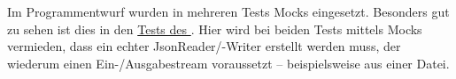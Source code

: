 Im Programmentwurf wurden in mehreren Tests Mocks eingesetzt.
Besonders gut zu sehen ist dies in den \href{https://github.com/yschiebelhut/carpool-java/blob/6d938e78763ca42270aafb8f51de4104c88e558a/0-carpool-java-plugin-json/src/test/java/speicher/LocalDateAdapterTest.java}{Tests des }.
Hier wird bei beiden Tests mittels Mocks vermieden, dass ein echter JsonReader/-Writer erstellt werden muss, der wiederum einen Ein-/Ausgabestream voraussetzt -- beispielsweise aus einer Datei.